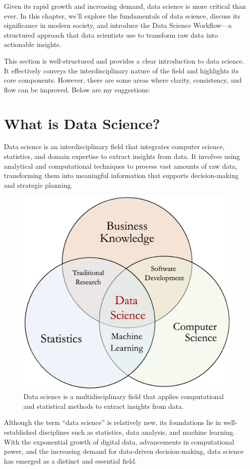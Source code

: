 \documentclass[
  11pt,
]{book}
\theoremstyle{definition}
\theoremstyle{definition}
\theoremstyle{definition}
\theoremstyle{definition}
\theoremstyle{remark}
\begin{document}
Given its rapid growth and increasing demand, data science is more critical than ever. In this chapter, we'll explore the fundamentals of data science, discuss its significance in modern society, and introduce the Data Science Workflow---a structured approach that data scientists use to transform raw data into actionable insights.

This section is well-structured and provides a clear introduction to data science. It effectively conveys the interdisciplinary nature of the field and highlights its core components. However, there are some areas where clarity, consistency, and flow can be improved. Below are my suggestions:

\section{What is Data Science?}\label{what-is-data-science}

Data science is an interdisciplinary field that integrates computer science, statistics, and domain expertise to extract insights from data. It involves using analytical and computational techniques to process vast amounts of raw data, transforming them into meaningful information that supports decision-making and strategic planning.

\begin{figure}[H]

{\centering \includegraphics[width=0.5\linewidth]{images/ch2_data_science} 

}

\caption{Data science is a multidisciplinary field that applies computational and statistical methods to extract insights from data.}\label{fig:Data-Science}
\end{figure}

Although the term ``data science'' is relatively new, its foundations lie in well-established disciplines such as statistics, data analysis, and machine learning. With the exponential growth of digital data, advancements in computational power, and the increasing demand for data-driven decision-making, data science has emerged as a distinct and essential field.
\end{document}
